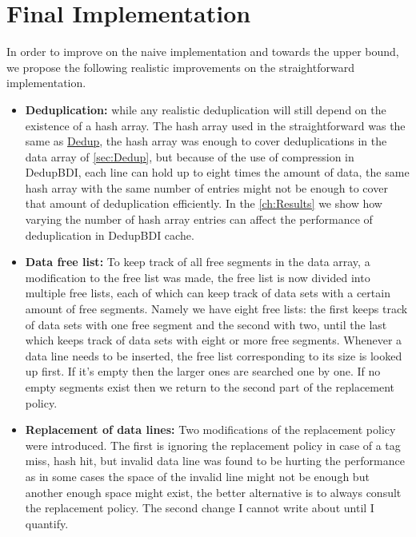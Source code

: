 \section{Final Implementation}
\label{sec:Final Implementation}
In order to improve on the naive implementation and towards the upper bound, we propose the following realistic improvements on the straightforward implementation.
\begin{itemize}
    \item \textbf{Deduplication:} while any realistic deduplication will still depend on the existence of a hash array. The hash array used in the straightforward was the same as \hyperref[sssec:DedupHash]{Dedup}, the hash array was enough to cover deduplications in the data array of \ref{sec:Dedup}, but because of the use of compression in DedupBDI, each line can hold up to eight times the amount of data, the same hash array with the same number of entries might not be enough to cover that amount of deduplication efficiently. In the \ref{ch:Results} we show how varying the number of hash array entries can affect the performance of deduplication in DedupBDI cache.
    \item \textbf{Data free list:} To keep track of all free segments in the data array, a modification to the free list was made, the free list is now divided into multiple free lists, each of which can keep track of data sets with a certain amount of free segments. Namely we have eight free lists: the first keeps track of data sets with one free segment and the second with two, until the last which keeps track of data sets with eight or more free segments. Whenever a data line needs to be inserted, the free list corresponding to its size is looked up first. If it's empty then the larger ones are searched one by one. If no empty segments exist then we return to the second part of the replacement policy.
    \item \textbf{Replacement of data lines:} Two modifications of the replacement policy were introduced. The first is ignoring the replacement policy in case of a tag miss, hash hit, but invalid data line was found to be hurting the performance as in some cases the space of the invalid line might not be enough but another enough space might exist, the better alternative is to always consult the replacement policy. The second change I cannot write about until I quantify.
\end{itemize}
